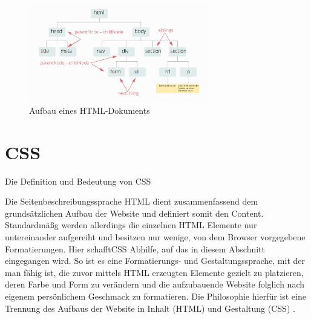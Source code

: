 \begin{figure}
  \centering
  \includegraphics[width=0.7\textwidth]{imports/HTML}
  \caption{Aufbau eines HTML-Dokuments \cite{dom.html}}
\end{figure}









\section{CSS}
\label{sec:CSS}

\begin{description}
	\item[Die Definition und Bedeutung von CSS]
    \hfill 
    \label{des:Def_CSS}
\end{description}
%
Die Seitenbeschreibungssprache \ac{HTML} dient zusammenfassend dem grundsätzlichen Aufbau der Website und definiert somit den Content. Standardmäßg werden allerdings die einzelnen \ac{HTML} Elemente nur untereinander aufgereiht und besitzen nur wenige, von dem Browser vorgegebene Formatierungen. Hier schafft\ac{CSS} Abhilfe, auf das in diesem Abschnitt eingegangen wird. So ist es eine Formatierungs- und Gestaltungssprache, mit der man fähig ist, die zuvor mittels \ac{HTML} erzeugten Elemente gezielt zu platzieren, deren Farbe und Form zu verändern und die aufzubauende Website folglich nach eigenem persönlichem Geschmack zu formatieren. Die Philosophie hierfür ist eine Trennung des Aufbaus der Website in Inhalt (\ac{HTML}) und Gestaltung (\ac{CSS}) \cite{css}.

